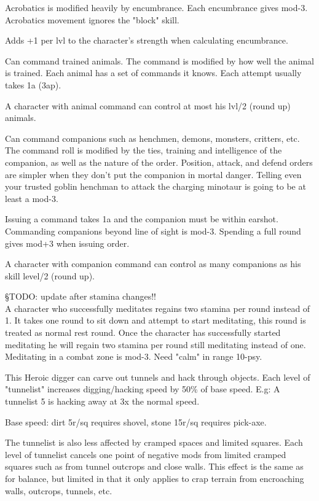 Acrobatics is modified heavily by encumbrance. Each encumbrance gives mod-3.
Acrobatics movement ignores the "block" skill.


 Adds +1 per lvl to the character's strength when calculating encumbrance.


 Can command trained animals. The command is modified by how well the animal is trained. Each animal has a set of commands it knows. Each attempt usually takes 1a (3ap).

A character with animal command can control at most his lvl/2 (round up) animals.


 Can command companions such as henchmen, demons, monsters, critters, etc. The command roll is modified by the ties, training and intelligence of the companion, as well as the nature of the order. Position, attack, and defend orders are simpler when they don't put the companion in mortal danger. Telling even your trusted goblin henchman to attack the charging minotaur is going to be at least a mod-3.

Issuing a command takes 1a and the companion must be within earshot. Commanding companions beyond line of sight is mod-3. Spending a full round gives mod+3 when issuing order.

A character with companion command can control as many companions as his skill level/2 (round up).


 §TODO: update after stamina changes!!\\
A character who successfully meditates regains two stamina per round instead of 1. It takes one round to sit down and attempt to start meditating, this round is treated as normal rest round. Once the character has successfully started meditating he will regain two stamina per round still meditating instead of one.
Meditating in a combat zone is mod-3. Need "calm" in range 10-psy.


 This Heroic digger can carve out tunnels and hack through objects. Each level of "tunnelist" increases digging/hacking speed by 50\% of base speed. E.g: A tunnelist 5 is hacking away at 3x the normal speed.

Base speed: dirt 5r/sq requires shovel, stone 15r/sq requires pick-axe.

The tunnelist is also less affected by cramped spaces and limited squares. Each level of tunnelist cancels one point of negative mods from limited cramped squares such as from tunnel outcrops and close walls. This effect is the same as for balance, but limited in that it only applies to crap terrain from encroaching walls, outcrops, tunnels, etc.


